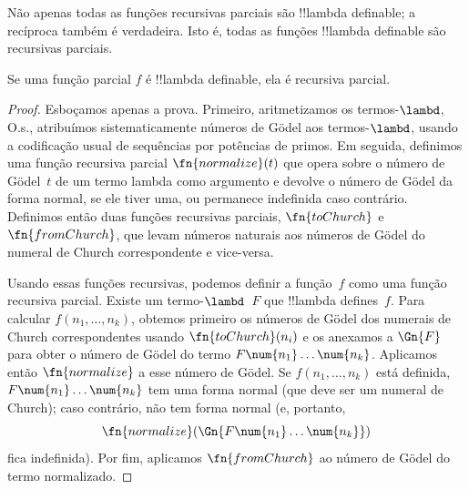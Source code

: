 \documentclass[../../../include/open-logic-section]{subfiles}
\begin{document}

Não apenas todas as funções recursivas parciais são !!{lambda definable}; a
recíproca também é verdadeira. Isto é, todas as funções !!{lambda definable} são
recursivas parciais.

\begin{thm}
   Se uma função parcial $f$ é
  !!{lambda definable}, ela é recursiva parcial.
\end{thm}

\begin{proof}
  Esboçamos apenas a prova. Primeiro, aritmetizamos os termos-$\lambd$,
  O.s.\@, atribuímos sistematicamente números de G\"odel aos termos-$\lambd$, usando
  a codificação usual de sequências por potências de primos. Em seguida, definimos uma
  função recursiva parcial $\fn{normalize}(t)$ que opera sobre o
  número de G\"odel~$t$ de um termo lambda como argumento e devolve
  o número de G\"odel da forma normal, se ele tiver uma, ou permanece indefinida
  caso contrário. Definimos então duas funções recursivas parciais,
  $\fn{toChurch}$ e $\fn{fromChurch}$, que levam números naturais aos
  números de G\"odel do numeral de Church correspondente e vice-versa.

  Usando essas funções recursivas, podemos definir a função~$f$ como uma
  função recursiva parcial. Existe um termo-$\lambd$~$F$ que
  !!{lambda define}s~$f$. Para calcular $f(n_1, \dots, n_k)$, obtemos primeiro
  os números de G\"odel dos numerais de Church correspondentes usando
  $\fn{toChurch}(n_i)$ e os anexamos a $\Gn{F}$ para obter o número de G\"odel
  do termo $F \num{n_1}\dots\num{n_k}$. Aplicamos então
  $\fn{normalize}$ a esse número de G\"odel. Se $f(n_1, \dots, n_k)$ está
  definida, $F \num{n_1}\dots\num{n_k}$ tem uma forma normal (que deve
  ser um numeral de Church); caso contrário, não tem forma normal (e, portanto,
  \[\fn{normalize}(\Gn{F\num{n_1}\dots\num{n_k}})\] fica indefinida).
  Por fim, aplicamos $\fn{fromChurch}$ ao número de G\"odel do
  termo normalizado.
\end{proof}
\end{document}
